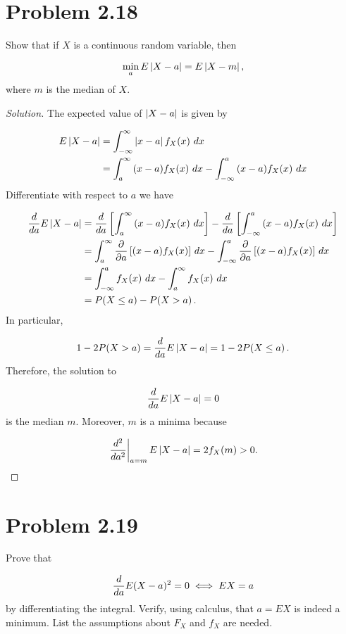 \documentclass[12pt,letterpaper,reqno]{amsart}
\numberwithin{equation}{subsection}
\begin{document}
\newpage
\section{Problem 2.18}

Show that if $X$ is a continuous random variable, then

\[ \min_a E \Abs{X-a} = E \Abs{X-m}, \]
where $m$ is the median of $X$.

\begin{proof}[Solution] The expected value of $\Abs{X-a}$ is given by

\begin{align*}
    E\Abs{X-a} &= \myint{\Abs{x-a} f_X(x)}{x}{-\infty}{\infty} \\
    &= \myint{(x-a)f_X(x)}{x}{a}{\infty} - \myint{(x-a)f_X(x)}{x}{-\infty}{a} \\
\end{align*}
Differentiate with respect to $a$ we have

\begin{align*}
    \Dif{}{a} E\Abs{X-a} &= \Dif{}{a} \left[ \myint{(x-a)f_X(x)}{x}{a}{\infty} \right] - \Dif{}{a} \left[ \myint{(x-a)f_X(x)}{x}{-\infty}{a} \right] \\
    &= \myint{\dif{}{a}\left[(x-a)f_X(x) \right]}{x}{a}{\infty} - \myint{\dif{}{a} \left[ (x-a)f_X(x) \right]}{x}{-\infty}{a} \\
    &= \myint{f_X(x)}{x}{-\infty}{a} - \myint{f_X(x)}{x}{a}{\infty} \\
    &= \fun{P}{X \leq a} - \fun{P}{X > a}.
\end{align*}
In particular,

\[ 1- 2\fun{P}{X > a} = \Dif{}{a} E\Abs{X-a} = 1 - 2\fun{P}{X \leq a}. \]
Therefore, the solution to

\[ \Dif{}{a} E\Abs{X-a} = 0 \]
is the median $m$. Moreover, $m$ is a minima because

\begin{align*}
    \left.\Dif{^2}{a^2}\right\vert_{a=m} E \Abs{X-a} = 2f_X(m) > 0.
\end{align*}
\end{proof}

\newpage
\section{Problem 2.19}

Prove that

\[ \Dif{}{a} E(X-a)^2 = 0 \iff EX = a \]
by differentiating the integral. Verify, using calculus, that $a = EX$ is indeed a minimum. List the assumptions about $F_X$ and $f_X$ are needed.
\end{document}
